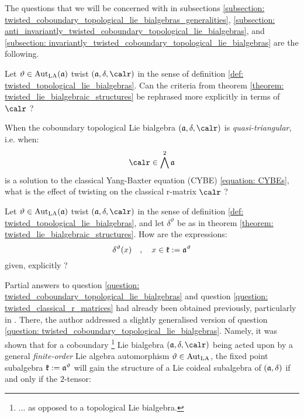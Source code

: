         The questions that we will be concerned with in subsections \ref{subsection: twisted_coboundary_topological_lie_bialgebras_generalities}, \ref{subsection: anti_invariantly_twisted_coboundary_topological_lie_bialgebras}, and \ref{subsection: invariantly_twisted_coboundary_topological_lie_bialgebras} are the following.
        \begin{question} \label{question: twisted_coboundary_topological_lie_bialgebras}
            Let $\vartheta \in \operatorname{Aut}_{\mathrm{LA}}(\mathfrak{a})$ twist $(\a, \delta, \calr)$ in the sense of definition \ref{def: twisted_topological_lie_bialgebras}. Can the criteria from theorem \ref{theorem: twisted_lie_bialgebraic_structures} be rephrased more explicitly in terms of $\calr$ ?
        \end{question}
        \begin{question} \label{question: twisted_classical_r_matrices}
            When the coboundary topological Lie bialgebra $(\a, \delta, \calr)$ is \textit{quasi-triangular}, i.e. when:
                $$\calr \in \bigwedge^2 \a$$
            is a solution to the classical Yang-Baxter equation (CYBE) \eqref{equation: CYBEs}, what is the effect of twisting on the classical r-matrix $\calr$ ?
        \end{question}
        \begin{question} \label{question: explicit_expressions_for_twisted_cobrackets}
            Let $\vartheta \in \operatorname{Aut}_{\mathrm{LA}}(\mathfrak{a})$ twist $(\a, \delta, \calr)$ in the sense of definition \ref{def: twisted_topological_lie_bialgebras}, and let $\delta^{\vartheta}$ be as in theorem \ref{theorem: twisted_lie_bialgebraic_structures}. How are the expressions:
                $$\delta^{\vartheta}(x) \quad, \quad x \in \mathfrak{k} := \mathfrak{a}^{\vartheta}$$
            given, explicitly ?
        \end{question}
        Partial answers to question \ref{question: twisted_coboundary_topological_lie_bialgebras} and question \ref{question: twisted_classical_r_matrices} had already been obtained previously, particularly in \cite{schrader_integrable_systems_from_classical_reflection_equations}. There, the author addressed a slightly generalised version of question \ref{question: twisted_coboundary_topological_lie_bialgebras}. Namely, it was shown that for a coboundary \footnote{... as opposed to a topological Lie bialgebra.} Lie bialgebra $(\a, \delta, \calr)$ being acted upon by a general \textit{finite-order} Lie algebra automorphism $\vartheta \in \operatorname{Aut}_{\mathrm{LA}}$, the fixed point subalgebra $\mathfrak{k} := \mathfrak{a}^{\vartheta}$ will gain the structure of a Lie coideal subalgebra of $(\mathfrak{a}, \delta)$ if and only if the $2$-tensor:
